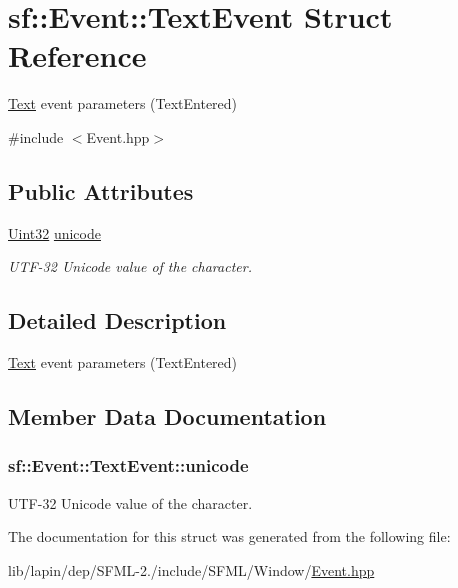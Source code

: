\hypertarget{structsf_1_1_event_1_1_text_event}{\section{sf\-:\-:Event\-:\-:Text\-Event Struct Reference}
\label{structsf_1_1_event_1_1_text_event}
}


\hyperlink{classsf_1_1_text}{Text} event parameters (Text\-Entered)  




{\ttfamily \#include $<$Event.\-hpp$>$}

\subsection*{Public Attributes}
\begin{DoxyCompactItemize}
\item 
\hyperlink{namespacesf_aa746fb1ddef4410bddf198ebb27e727c}{Uint32} \hyperlink{structsf_1_1_event_1_1_text_event_a00d96b1a5328a1d7cbc276e161befcb0}{unicode}
\begin{DoxyCompactList}\small\item\em U\-T\-F-\/32 Unicode value of the character. \end{DoxyCompactList}\end{DoxyCompactItemize}


\subsection{Detailed Description}
\hyperlink{classsf_1_1_text}{Text} event parameters (Text\-Entered) 

\subsection{Member Data Documentation}
\hypertarget{structsf_1_1_event_1_1_text_event_a00d96b1a5328a1d7cbc276e161befcb0}{
\subsubsection[{unicode}]{ sf\-::\-Event\-::\-Text\-Event\-::unicode}}\label{structsf_1_1_event_1_1_text_event_a00d96b1a5328a1d7cbc276e161befcb0}


U\-T\-F-\/32 Unicode value of the character. 



The documentation for this struct was generated from the following file\-:\begin{DoxyCompactItemize}
\item 
lib/lapin/dep/\-S\-F\-M\-L-\/2./include/\-S\-F\-M\-L/\-Window/\hyperlink{lib_2lapin_2dep_2_s_f_m_l-2_83_2include_2_s_f_m_l_2_window_2_event_8hpp}{Event.\-hpp}\end{DoxyCompactItemize}
